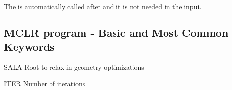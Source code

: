 The  is automatically called after 
and it is not needed in the input.

\subsection{MCLR program - Basic and Most Common Keywords}
\begin{keywordlist}
\item[SALA] Root to relax in geometry optimizations
\item[ITER] Number of iterations
\item[]

\end{keywordlist}


